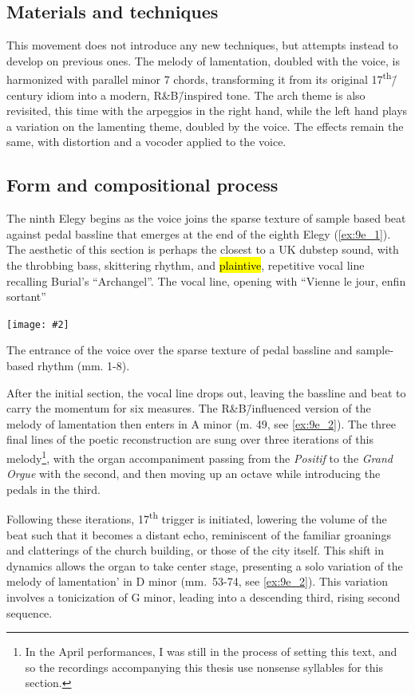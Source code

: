\documentclass[12pt,twoside,maitrise]{dms_ks}
\newcommand{\customincludeexamples}[4][]{%
    \begin{example}[H]
        \centering
        \texttt{[image: \#2]}
        \caption{#4}
	\label{#3} 
    \end{example}
}
\theoremstyle{definition}
\begin{document}
{\subsection{Materials and techniques}

This movement does not introduce any new techniques, but attempts instead to develop on previous ones.
The melody of lamentation, doubled with the voice, is harmonized with parallel minor 7 chords, transforming it from its original 17\textsuperscript{th}\=/century idiom into a modern, R\&B\=/inspired tone. 
The arch theme is also revisited, this time with the arpeggios in the right hand, while the left hand plays a variation on the lamenting theme, doubled by the voice.
The effects remain the same, with distortion and a vocoder applied to the voice.

\subsection{Form and compositional process}

The ninth Elegy begins as the voice joins the sparse texture of sample based beat against pedal bassline that emerges at the end of the eighth Elegy (\cref{ex:9e_1}). 
The aesthetic of this section is perhaps the closest to a UK dubstep sound, with the throbbing bass, skittering rhythm, and \hl{plaintive}, repetitive vocal line recalling Burial's “Archangel”. 
The vocal line, opening with “Vienne le jour, enfin sortant”

\customincludeexamples[width=\textwidth]{9e_1}{ex:9e_1}{The entrance of the voice over the sparse texture of pedal bassline and sample-based rhythm (mm. 1-8).}

After the initial section, the vocal line drops out, leaving the bassline and beat to carry the momentum for six measures. 
The R\&B\=/influenced version of the melody of lamentation then enters in A minor  (m. 49, see \cref{ex:9e_2}). 
The three final lines of the poetic reconstruction are sung over three iterations of this melody\footnote{In the April performances, I was still in the process of setting this text, and so the recordings accompanying this thesis use nonsense syllables for this section.}, with the organ accompaniment passing from the \textit{Positif} to the \textit{Grand Orgue} with the second, and then moving up an octave while introducing the pedals in the third.

Following these iterations, 17\textsuperscript{th} trigger is initiated, lowering the volume of the beat such that it becomes a distant echo, reminiscent of the familiar groanings and clatterings of the church building, or those of the city itself. 
This shift in dynamics allows the organ to take center stage, presenting a solo variation of the melody of lamentation' in D minor (mm.~53-74, see \cref{ex:9e_2}). 
This variation involves a tonicization of G minor, leading into a descending third, rising second sequence.

}
\end{document}
